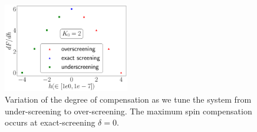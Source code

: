 \documentclass[reprint,prb,superscriptaddress]{revtex4-2}
\begin{document}
\begin{figure}[htpb]
	\centering
	\includegraphics[width=0.49\textwidth]{plt/deg_of_comp.pdf}
	\caption{Variation of the degree of compensation as we tune the system from under-screening to over-screening. The maximum spin compensation occurs at exact-screening \(\delta=0\).}
\end{figure}
\end{document}
